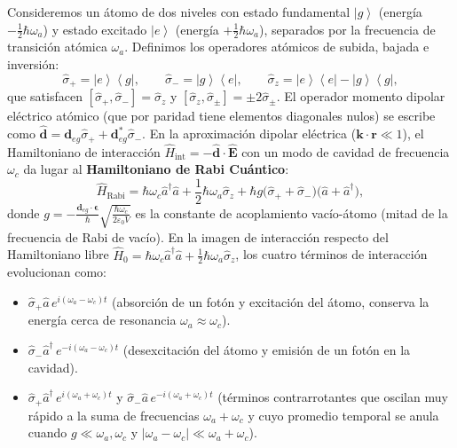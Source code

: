 \documentclass[11pt,a4paper,twoside]{report}
\theoremstyle{definition}
\theoremstyle{plain}
\theoremstyle{remark}
\newcommand{\ket}[1]{\left| #1 \right\rangle}
\newcommand{\ketbra}[2]{\left| #1 \right\rangle\!\left\langle #2 \right|}
\newcommand{\comm}[2]{\left[ #1, #2 \right]}
\newcommand{\op}[1]{\hat{#1}}
\begin{document}
Consideremos un átomo de dos niveles con estado fundamental $\ket{g}$ (energía $-\frac{1}{2}\hbar\omega_a$) y estado excitado $\ket{e}$ (energía $+\frac{1}{2}\hbar\omega_a$), separados por la frecuencia de transición atómica $\omega_a$. Definimos los operadores atómicos de subida, bajada e inversión:
\begin{equation}
    \op{\sigma}_+ = \ketbra{e}{g}, \qquad \op{\sigma}_- = \ketbra{g}{e}, \qquad \op{\sigma}_z = \ketbra{e}{e} - \ketbra{g}{g},
\end{equation}
que satisfacen $\comm{\op{\sigma}_+}{\op{\sigma}_-} = \op{\sigma}_z$ y $\comm{\op{\sigma}_z}{\op{\sigma}_\pm} = \pm 2\op{\sigma}_\pm$. El operador momento dipolar eléctrico atómico (que por paridad tiene elementos diagonales nulos) se escribe como $\bm{\op{d}} = \bm{d}_{eg}\op{\sigma}_+ + \bm{d}_{eg}^*\op{\sigma}_-$. En la aproximación dipolar eléctrica ($\bm{k}\cdot\bm{r} \ll 1$), el Hamiltoniano de interacción $\op{H}_{\text{int}} = -\bm{\op{d}}\cdot\bm{\op{E}}$ con un modo de cavidad de frecuencia $\omega_c$ da lugar al \textbf{Hamiltoniano de Rabi Cuántico}:
\begin{equation}
    \op{H}_{\text{Rabi}} = \hbar\omega_c \op{a}^\dagger\op{a} + \frac{1}{2}\hbar\omega_a \op{\sigma}_z + \hbar g\big(\op{\sigma}_+ + \op{\sigma}_-\big)\big(\op{a} + \op{a}^\dagger\big),
\end{equation}
donde $g = -\frac{\bm{d}_{eg}\cdot\bm{\epsilon}}{\hbar}\sqrt{\frac{\hbar\omega_c}{2\varepsilon_0 V}}$ es la constante de acoplamiento vacío-átomo (mitad de la frecuencia de Rabi de vacío). En la imagen de interacción respecto del Hamiltoniano libre $\op{H}_0 = \hbar\omega_c\op{a}^\dagger\op{a} + \frac{1}{2}\hbar\omega_a\op{\sigma}_z$, los cuatro términos de interacción evolucionan como:
\begin{itemize}
    \item $\op{\sigma}_+\op{a}\, e^{i(\omega_a - \omega_c)t}$ (absorción de un fotón y excitación del átomo, conserva la energía cerca de resonancia $\omega_a \approx \omega_c$).
    \item $\op{\sigma}_-\op{a}^\dagger\, e^{-i(\omega_a - \omega_c)t}$ (desexcitación del átomo y emisión de un fotón en la cavidad).
    \item $\op{\sigma}_+\op{a}^\dagger\, e^{i(\omega_a + \omega_c)t}$ y $\op{\sigma}_-\op{a}\, e^{-i(\omega_a + \omega_c)t}$ (términos contrarrotantes que oscilan muy rápido a la suma de frecuencias $\omega_a + \omega_c$ y cuyo promedio temporal se anula cuando $g \ll \omega_a, \omega_c$ y $|\omega_a - \omega_c| \ll \omega_a + \omega_c$).
\end{itemize}
\end{document}
